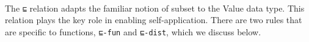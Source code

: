 \begin{fence}
\begin{code}%
\>[0]\AgdaSpace{}%
\AgdaSpace{}%
\<%
\\
\>[0]\AgdaSpace{}%
\AgdaSpace{}%
\<%
\\
%
\\[\AgdaEmptyExtraSkip]%
\>[0]\AgdaSpace{}%
\AgdaSpace{}%
\AgdaSymbol{:}\AgdaSpace{}%
\AgdaSpace{}%
\<%
\\
\>[0][@{}l@{\AgdaIndent{0}}]%
\>[2]\AgdaSpace{}%
\AgdaSymbol{:}\AgdaSpace{}%
\<%
\\
%
\>[2]\AgdaSpace{}%
\AgdaSymbol{:}\AgdaSpace{}%
\AgdaSpace{}%
\AgdaSpace{}%
\AgdaSpace{}%
\AgdaSpace{}%
\<%
\\
%
\>[2]\AgdaSpace{}%
\AgdaSymbol{:}\AgdaSpace{}%
\AgdaSpace{}%
\AgdaSpace{}%
\AgdaSpace{}%
\AgdaSpace{}%
\<%
\end{code}
\end{fence}

The \texttt{⊑} relation adapts the familiar notion of subset to the
Value data type. This relation plays the key role in enabling
self-application. There are two rules that are specific to functions,
\texttt{⊑-fun} and \texttt{⊑-dist}, which we discuss below.

